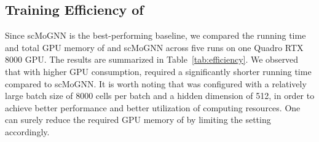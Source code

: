 \subsection{Training Efficiency of \method{}} \label{sec:efficiency}
Since scMoGNN is the best-performing baseline, we compared the running time and total GPU memory of \method{} and scMoGNN across five runs on one Quadro RTX 8000 GPU. The results are summarized in Table~\ref{tab:efficiency}. We observed that with higher GPU consumption, \method{} required a significantly shorter running time compared to scMoGNN. It is worth noting that \method{} was configured with a relatively large batch size of 8000 cells per batch and a hidden dimension of 512, in order to achieve better performance and better utilization of computing resources. One can surely reduce the required GPU memory of \method{} by limiting the setting accordingly. 

\begin{table}[h]
\centering
\vspace{-0.5em}
\caption{Efficiency Comparison}\label{tab:efficiency}
\vspace{-1.2em}
\vspace{-0.8em}
\end{table}

